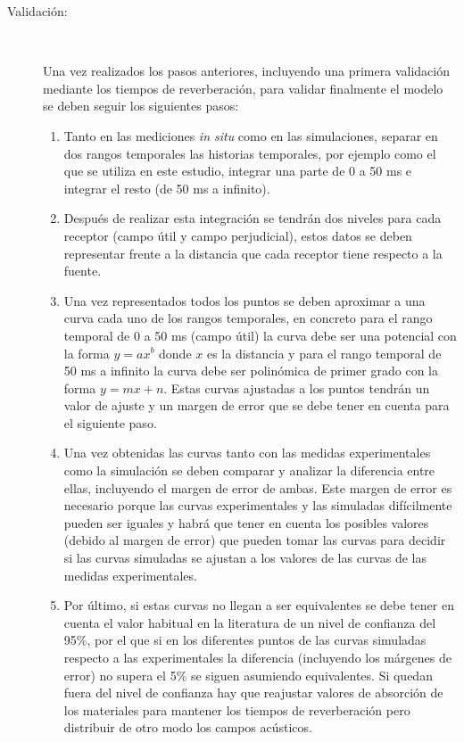 \begin{description}
\item[Validación:]~

Una vez realizados los pasos anteriores, incluyendo una primera validación mediante los tiempos de reverberación, para validar finalmente el modelo se deben seguir los siguientes pasos:

\begin{enumerate}
  \item Tanto en las mediciones \textit{in situ} como en las simulaciones, separar en dos rangos temporales las historias temporales, por ejemplo como el que se utiliza en este estudio, integrar una parte de 0 a 50 ms e integrar el resto (de 50 ms a infinito).
  \item Después de realizar esta integración se tendrán dos niveles para cada receptor (campo útil y campo perjudicial), estos datos se deben representar frente a la distancia que cada receptor tiene respecto a la fuente. 
  \item Una vez representados todos los puntos se deben aproximar a una curva cada uno de los rangos temporales, en concreto para el rango temporal de 0 a 50 ms (campo útil) la curva debe ser una potencial con la forma $y=ax^b$ donde $x$ es la distancia y para el rango temporal de 50 ms a infinito la curva debe ser polinómica de primer grado con la forma $y=mx+n$. Estas curvas ajustadas a los puntos tendrán un valor de ajuste y un margen de error que se debe tener en cuenta para el siguiente paso. 
  \item Una vez obtenidas las curvas tanto con las medidas experimentales como la simulación se deben comparar y analizar la diferencia entre ellas, incluyendo el margen de error de ambas. Este margen de error es necesario porque las curvas experimentales y las simuladas difícilmente pueden ser iguales y habrá que tener en cuenta los posibles valores (debido al margen de error) que pueden tomar las curvas para decidir si las curvas simuladas se ajustan a los valores de las curvas de las medidas experimentales.
  \item Por último, si estas curvas no llegan a ser equivalentes se debe tener en cuenta el valor habitual en la literatura de un nivel de confianza del 95\%, por el que si en los diferentes puntos de las curvas simuladas respecto a las experimentales la diferencia (incluyendo los márgenes de error) no supera el 5\% se siguen asumiendo equivalentes. Si quedan fuera del nivel de confianza hay que reajustar valores de absorción de los materiales para mantener los tiempos de reverberación pero distribuir de otro modo los campos acústicos.
\end{enumerate}


\end{description}


